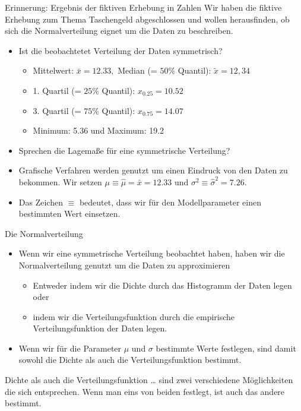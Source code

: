\documentclass[usenames,dvipsnames,handout]{beamer}
\begin{document}
\begin{frame}{Erinnerung: Ergebnis der fiktiven Erhebung in Zahlen}
Wir haben die fiktive Erhebung zum Thema Taschengeld abgeschlossen und wollen herausfinden,
ob sich die Normalverteilung eignet um die Daten zu beschreiben.
\begin{itemize}
\item{Ist die beobachtetet Verteilung der Daten symmetrisch?}
\begin{itemize}
\item{Mittelwert: $\bar{x}=12.33,$ Median (= $50\%$ Quantil): $\tilde{x}=12,34$}\pause
\item{1. Quartil (= $25\%$ Quantil): $x_{0.25}=10.52$}\pause
\item{3. Quartil (= $75\%$ Quantil): $x_{0.75}=14.07$}\pause
\item{Minimum: 5.36 und Maximum: 19.2}\pause
\end{itemize}
\item{Sprechen die Lagemaße für eine symmetrische Verteilung?}\pause
\item{Grafische Verfahren werden genutzt um einen Eindruck von den Daten zu bekommen. Wir setzen $\mu \equiv \hat{\mu}=\bar{x}=12.33$ und $\sigma^{2} \equiv \hat{\sigma}^{2}=7.26.$}\pause
\item{Das Zeichen $\equiv$ bedeutet, dass wir für den Modellparameter einen bestimmten Wert einsetzen.}
\end{itemize}
\end{frame}


\begin{frame}{Die Normalverteilung }
\begin{itemize}
\item{Wenn wir eine symmetrische Verteilung beobachtet haben,
haben wir die Normalverteilung genutzt um die Daten zu approximieren}
\begin{itemize}
\item{Entweder indem wir die Dichte durch das Histogramm der Daten legen oder}
\item{indem wir die Verteilungsfunktion durch die empirische Verteilungsfunktion der Daten legen.}
\end{itemize}
\item{Wenn wir für die Parameter $\mu$ und $\sigma$ bestimmte Werte festlegen, sind damit sowohl
die Dichte als auch die Verteilungsfunktion bestimmt.}
\end{itemize}
\begin{block}{Dichte als auch die Verteilungsfunktion \dots}
sind zwei verschiedene Möglichkeiten die sich entsprechen. Wenn man eins von beiden festlegt,
ist auch das andere bestimmt.
\end{block}
\end{frame}
\end{document}
